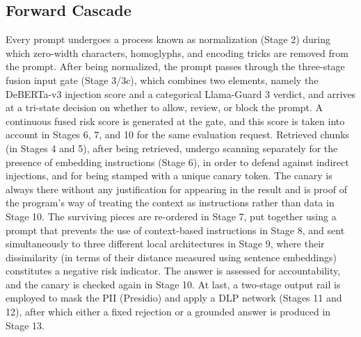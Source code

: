 \documentclass[conference]{IEEEtran}
\begin{document}
\subsection{Forward Cascade}
Every prompt undergoes a process known as normalization (Stage 2) during which zero-width characters, homoglyphs, and encoding tricks are removed from the prompt. After being normalized, the prompt passes through the three-stage fusion input gate (Stage 3/3c), which combines two elements, namely the DeBERTa-v3 injection score and a categorical Llama-Guard 3 verdict, and arrives at a tri-state decision on whether to allow, review, or block the prompt. A continuous fused risk score is generated at the gate, and this score is taken into account in Stages 6, 7, and 10 for the same evaluation request. Retrieved chunks (in Stages 4 and 5), after being retrieved, undergo scanning separately for the presence of embedding instructions (Stage 6), in order to defend against indirect injections, and for being stamped with a unique canary token. The canary is always there without any justification for appearing in the result and is proof of the program's way of treating the context as instructions rather than data in Stage 10. The surviving pieces are re-ordered in Stage 7, put together using a prompt that prevents the use of context-based instructions in Stage 8, and sent simultaneously to three different local architectures in Stage 9, where their dissimilarity (in terms of their distance measured using sentence embeddings) constitutes a negative risk indicator. The answer is assessed for accountability, and the canary is checked again in Stage 10. At last, a two-stage output rail is employed to mask the PII (Presidio) and apply a DLP network (Stages 11 and 12), after which either a fixed rejection or a grounded answer is produced in Stage 13.
\end{document}

